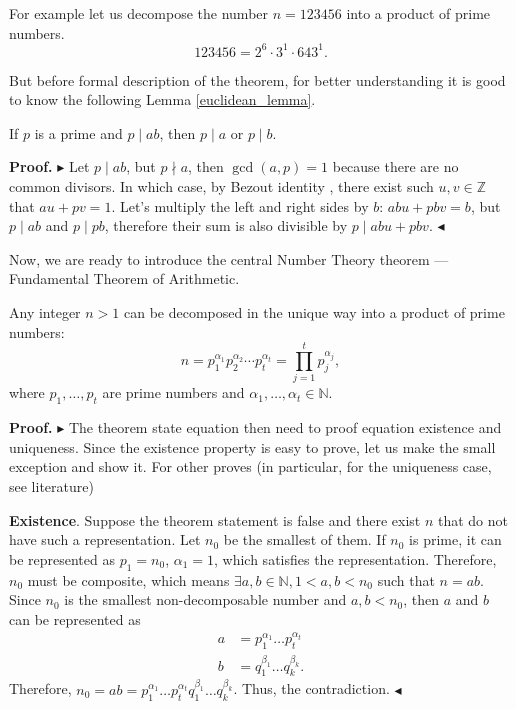 \documentclass[../lecture-notes-148x210.tex]{subfiles}
\begin{document}
\begin{example}
    For example let us decompose the number $n = 123456$ into a product of prime numbers.
    \begin{equation*}
        123456 = 2^6 \cdot 3^1 \cdot 643^1.
    \end{equation*}
\end{example}

But before formal description of the theorem, for better understanding it is good to know the following Lemma \ref{euclidean_lemma}.

\begin{lemma}[Euclidean] \label{euclidean_lemma}
    If $p$ is a prime and $p \mid ab$, then $p \mid a$ or $p \mid b$.
\end{lemma}

\textbf{Proof.} 
$\blacktriangleright$
Let $p \mid ab$, but $ p \nmid a$, then $\gcd(a, p) = 1$ because there are no common divisors.
In which case, by Bezout identity , there exist such $u, v \in \mathbb{Z}$ that $au + pv = 1$.
Let's multiply the left and right sides by $b$: $abu + pbv = b$, but $p \mid ab$ and $p \mid pb$, therefore their sum is also divisible by $p \mid abu + pbv$. 
$\blacktriangleleft$

Now, we are ready to introduce the central Number Theory theorem --- Fundamental
Theorem of Arithmetic.

\begin{theorem}\label{th:fundamental_arithmetic}
    Any integer $n>1$ can be decomposed in the unique way into a product of prime numbers:
    \begin{equation*}
        n = p_1^{\alpha_1}p_2^{\alpha_2}\cdots p_t^{\alpha_t} = \prod_{j=1}^t p_j^{\alpha_j},
    \end{equation*}
    where $p_1,\dots,p_t$ are prime numbers and $\alpha_1,\dots,\alpha_t \in \mathbb{N}$.
\end{theorem}

\textbf{Proof.} 
$\blacktriangleright$  
The theorem state equation then need to proof equation existence and uniqueness. Since the existence property is 
easy to prove, let us make the small exception and show it. For other proves (in particular, for the uniqueness case, see literature)

\textcolor{green!60!black}{\textbf{Existence}}. Suppose the theorem statement is false and there exist $n$ that do not have such a representation.
Let $n_0$ be the smallest of them.
If $n_0$ is prime, it can be represented as $p_1=n_0$, $\alpha_1=1$, which satisfies the representation. Therefore, $n_0$ must be composite, which means $\exists a, b \in \mathbb{N}, 1 < a, b < n_0$ such that $n = ab$.
Since $n_0$ is the smallest non-decomposable number and $a, b < n_0$, then $a$ and $b$ can be represented as 
\begin{align*}
    a &= p_{1}^{\alpha_{1}} \dots p_{t}^{\alpha_{t}} \\
    b &= q_{1}^{\beta_{1}} \dots q_{k}^{\beta_{k}}.
\end{align*}
Therefore, $n_0 = ab=p_{1}^{\alpha_{1}} \dots p_{t}^{\alpha_{t}} q_{1}^{\beta_{1}} \dots q_{k}^{\beta_{k}}$. Thus, the contradiction. $\blacktriangleleft$  
\end{document}
